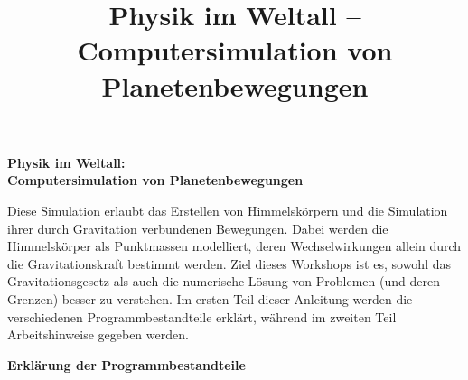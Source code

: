 \documentclass{scrartcl}
\title{Physik im Weltall -- Computersimulation von Planetenbewegungen}
\date{}
\begin{document}
\begin{center}
    {\huge\textbf{\sffamily Physik im Weltall:\\ Computersimulation von Planetenbewegungen}\\[1cm]}
\end{center}
Diese Simulation erlaubt das Erstellen von Himmelskörpern und die Simulation ihrer durch Gravitation verbundenen Bewegungen.
Dabei werden die Himmelskörper als Punktmassen modelliert, deren Wechselwirkungen allein durch die Gravitationskraft bestimmt werden.
Ziel dieses Workshops ist es, sowohl das Gravitationsgesetz als auch die numerische Lösung von Problemen (und deren Grenzen) besser zu verstehen.
Im ersten Teil dieser Anleitung werden die verschiedenen Programmbestandteile erklärt, während im zweiten Teil Arbeitshinweise gegeben werden.
\\[0.5cm]
\begin{center}
        {\Large\textbf{\sffamily Erklärung der Programmbestandteile}}\\[.5cm]
\end{center}
        \lstset{basicstyle=\texttt, tabsize=2, morekeywords=Programmname, keywordstyle=\textsc}%
\end{document}
